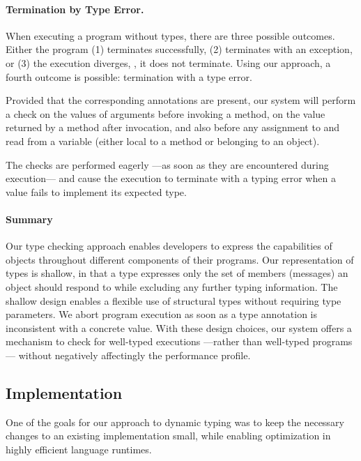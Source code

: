 \paragraph{Termination by Type Error.}
\label{sec:term-type-error}

When executing a program without types, there are three possible outcomes.
Either the program (1) terminates successfully,
(2) terminates with an exception, or 
(3) the execution diverges, \ie, it does not terminate.
Using our approach, a
fourth outcome is possible: termination with a type error.

Provided that the corresponding annotations are present, 
our system will perform a check
on the values of arguments before invoking a method, 
on the value returned by a method after invocation, and
also before any assignment to and read from a variable 
(either local to a method or belonging to an object). 

The checks are performed eagerly%
---as soon as they are encountered during execution---%
and cause the execution to terminate with a typing error 
when a value fails to implement its expected type.

\paragraph{Summary}
Our type checking approach enables developers to express
the capabilities of objects throughout different components of 
their programs.
Our representation of types is shallow,
in that a type expresses only the set of members (messages) an object
should respond to while excluding any further typing information. 
The shallow design enables a flexible use of structural types without
requiring type parameters.
We abort program execution as soon as
a type annotation is inconsistent with a concrete value. 
With these design choices, our system offers a
mechanism to check for well-typed executions%
---rather than well-typed programs---%
without negatively affectingly the performance profile.

\subsection{Implementation} 
\label{ssec:implementation} 

One of the goals for our approach to dynamic typing was to keep
the necessary changes to an existing implementation small,
while enabling optimization in highly efficient language runtimes.

